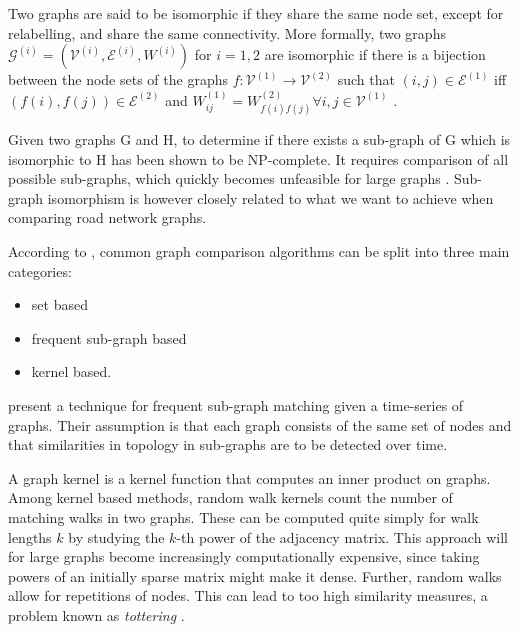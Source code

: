 Two graphs are said to be isomorphic if they share the same node set, except for relabelling, and share the same connectivity. More formally, two graphs $\mathcal{G}^{(i)} = (\mathcal{V}^{(i)}, \mathcal{E}^{(i)}, W^{(i)})$ for $i=1,2$ are isomorphic if there is a bijection between the node sets of the graphs $f : \mathcal{V}^{(1)} \rightarrow \mathcal{V}^{(2)}$ such that $(i,j) \in \mathcal{E}^{(1)}$ iff $(f(i), f(j)) \in \mathcal{E}^{(2)}$ and $W^{(1)}_{ij} = W^{(2)}_{f(i)f(j)} \forall i,j \in \mathcal{V}^{(1)}$ \citep{giacomo}.

Given two graphs G and H, to determine if there exists a sub-graph of G which is isomorphic to H has been shown to be NP-complete. It requires comparison of all possible sub-graphs, which quickly becomes unfeasible for large graphs \citep{graphlet_kernels}. Sub-graph isomorphism is however closely related to what we want to achieve when comparing road network graphs.

According to \cite{graphlet_kernels}, common graph comparison algorithms can be split into three main categories: 
\begin{itemize}
    \item set based
    \item frequent sub-graph based
    \item kernel based.
\end{itemize}



\cite{subgraphmatching} present a technique for frequent sub-graph matching given a time-series of graphs. Their assumption is that each graph consists of the same set of nodes and that similarities in topology in sub-graphs are to be detected over time. 

 A graph kernel is a kernel function that computes an inner product on graphs. Among kernel based methods, random walk kernels count the number of matching walks in two graphs. These can be computed quite simply for walk lengths $k$ by studying the $k$-th power of the adjacency matrix. This approach will for large graphs become increasingly computationally expensive, since taking powers of an initially sparse matrix might make it dense. Further, random walks allow for repetitions of nodes. This can lead to too high similarity measures, a problem known as \textit{tottering} \citep{shortestpath}.

